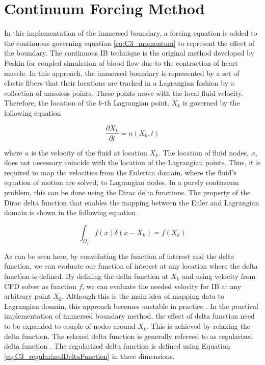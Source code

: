 \section{Continuum Forcing Method}
In this implementation of the immersed boundary, a forcing equation is added to the continuous governing equation \eqref{eq:C3_momentum} to represent the effect of the boundary. The continuous IB technique is the original method developed by Peskin \cite{peskin1972flow} for coupled simulation of blood flow due to the contraction of heart muscle. In this approach, the immersed boundary is represented by a set of elastic fibers that their locations are tracked in a Lagrangian fashion by a collection of massless points. These points move with the local fluid velocity. Therefore, the location of the $k$-th Lagrangian point, $X_k$ is governed by the following equation

\begin{equation}
	\frac{\partial X_k}{\partial t} = u(X_k, t)
\end{equation}

where $u$ is the velocity of the fluid at location $X_k$. The location of fluid nodes, $x$, does not necessary coincide with the location of the Lagrangian points. Thus, it is required to map the velocities from the Eulerian domain, where the fluid's equation of motion are solved, to Lagrangian nodes. In a purely continuum problem, this can be done using the Dirac delta functions. The property of the Dirac delta function that enables the mapping between the Euler and Lagrangian domain is shown in the following equation

\begin{equation}
	\int_{\Omega_f} f(x) \delta(x - X_k) = f(X_k)
\end{equation}

As can be seen here, by convoluting the function of interest and the delta function, we can evaluate our function of interest at any location where the delta function is defined. By defining the delta function at $X_k$ and using velocity from CFD solver as function $f$, we can evaluate the needed velocity for IB at any arbitrary point $X_k$. Although this is the main idea of mapping data to Lagrangian domain, this approach becomes unstable in practice \cite{lee2003stability}. In the practical implementation of immersed boundary method, the effect of delta function need to be expanded to couple of nodes around $X_k$. This is achieved by relaxing the delta function. The relaxed delta function is generally refereed to as regularized delta function \cite{shin2008assessment}. The regularized delta function is defined using Equation \eqref{eq:C3_regularizedDeltaFunction} in three dimensions.

